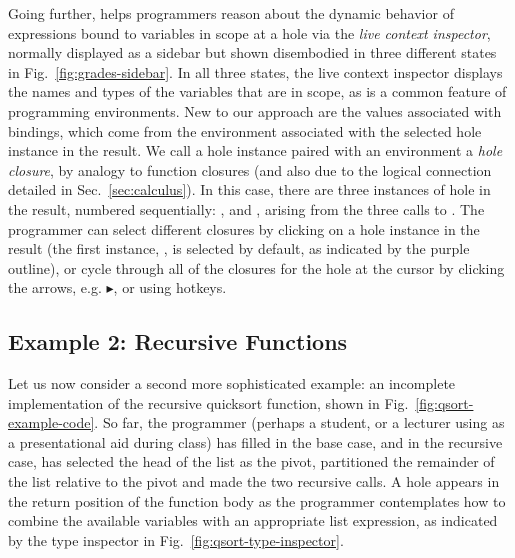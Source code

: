 Going further, \Hazel helps programmers reason about the dynamic behavior of expressions bound to variables in scope at a hole via the \emph{live context inspector}, normally displayed  as a sidebar but shown disembodied in three different states in Fig.~\ref{fig:grades-sidebar}. 
In all three states, the live context inspector displays the names and types of the variables that are in scope, as is a common feature of programming environments. 
New to our approach are the values associated with bindings, which come from the environment associated with the selected hole instance in the result. 
We call a hole instance paired with an  environment a \emph{hole closure}, by analogy to function closures (and also due to the logical connection detailed in Sec.~\ref{sec:calculus}). 
In this case, there are three instances of hole  in the result, numbered sequentially: ,  and , arising from the three calls to . 
The programmer can select different closures by clicking on a hole instance in the result (the first instance, , is selected by default, as indicated by the purple outline), or cycle through all of the closures for the hole at the cursor by clicking the arrows, e.g. $\blacktriangleright$, or using hotkeys.

\vspace{-4px}
\subsection{Example 2: Recursive Functions}\label{sec:qsort1}\label{sec:paths}
\vspace{-2px}



Let us now consider a second more sophisticated example: an incomplete implementation of the recursive quicksort function, shown in Fig.~\ref{fig:qsort-example-code}. So far, the programmer (perhaps a student, or a lecturer using \Hazel as a presentational aid during class) has filled in the base case, and in the recursive case, has selected the head of the list as the pivot, partitioned the remainder of the list relative to the pivot and made the two recursive calls. A hole appears in the return position of the function body as the programmer contemplates how to combine the available variables with an appropriate list expression, as indicated by the type inspector in Fig.~\ref{fig:qsort-type-inspector}.

